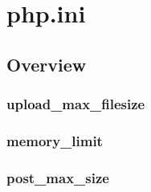 \part{php.ini}


\chapter{Overview}


\section{upload\_max\_filesize}



\section{memory\_limit}


\section{post\_max\_size}




